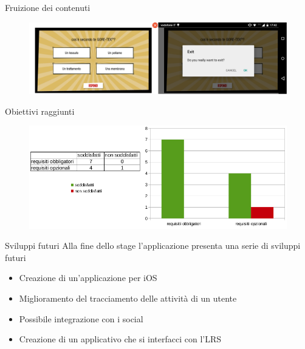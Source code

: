 \documentclass[aspectratio=43]{beamer}
\begin{document}
	\begin{frame}{Fruizione dei contenuti}
		\begin{figure}[H]
			\centering
			\includegraphics[scale=0.12]{images/prodotto_finale/content_tot}
		\end{figure}
	\end{frame}	

	\begin{frame}{Obiettivi raggiunti}
		\begin{figure}[H]
			\centering
			\includegraphics[scale=0.5]{images/requisiti}
		\end{figure}
	\end{frame}


	\begin{frame}{Sviluppi futuri}
		Alla fine dello stage l'applicazione presenta una serie di sviluppi futuri
		\begin{itemize}
			\item Creazione di un'applicazione per iOS
			\item Miglioramento del tracciamento delle attività di un utente
			\item Possibile integrazione con i social
			\item Creazione di un applicativo che si interfacci con l'LRS
		\end{itemize}
	\end{frame}
\end{document}
